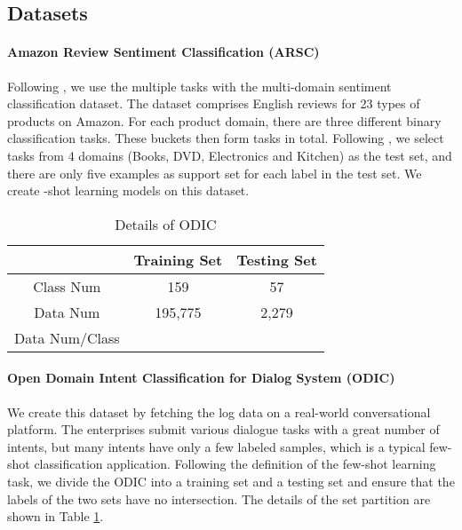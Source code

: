 \documentclass[11pt,a4paper]{article}
\begin{document}
\subsection{Datasets}
\paragraph{Amazon Review Sentiment Classification (ARSC)} Following \citet{yu2018diverse}, we use the multiple tasks with the multi-domain sentiment classification \citep{blitzer2007biographies} dataset. The dataset comprises English reviews for 23 types of products on Amazon. For each product domain, there are three different binary classification tasks. These buckets then form  tasks in total. Following \citet{yu2018diverse}, we select  tasks from 4 domains (Books, DVD, Electronics and Kitchen) as the test set, and there are only five examples as support set for each label in the test set. We create -shot learning models on this dataset. 
\begin{table} [t]
\centering
\small
\begin{tabular}{ccc}  
\toprule
 & \textbf{Training Set} & \textbf{Testing Set}\\ 
\midrule
Class Num& 159 & 57\\ 
Data Num & 195,775 & 2,279\\ 
Data Num/Class &   & \\ 
\bottomrule
\end{tabular}  
\caption{Details of ODIC}    
\label{table_odic}
\end{table}  

\paragraph{Open Domain Intent Classification for Dialog System (ODIC)} We create this dataset by fetching the log data on a real-world conversational platform. The enterprises submit various dialogue tasks with a great number of intents, but many intents have only a few labeled samples, which is a typical few-shot classification application. Following the definition of the few-shot learning task, we divide the ODIC into a training set and a testing set and ensure that the labels of the two sets have no intersection. The details of the set partition are shown in Table \ref{table_odic}.
\end{document}
